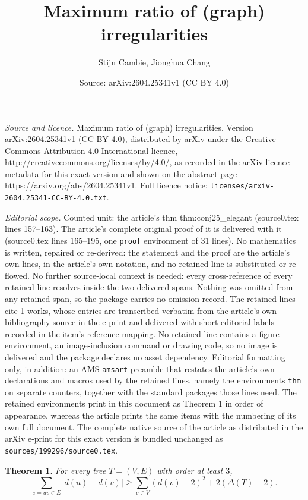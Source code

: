 \documentclass[10pt,a4paper]{amsart}
\title{Maximum ratio of (graph) irregularities}
\author{Stijn Cambie, Jionghua Chang}
\date{Source: arXiv:2604.25341v1 (CC BY 4.0)}
\newtheorem{thm}{Theorem}
\newcommand*{\abs}[1]{\lvert #1\rvert}
\begin{document}
\maketitle

\noindent\emph{Source and licence.} Maximum ratio of (graph) irregularities. Version arXiv:2604.25341v1 (CC BY 4.0), distributed by arXiv under the Creative Commons Attribution 4.0 International licence, http://creativecommons.org/licenses/by/4.0/, as recorded in the arXiv licence metadata for this exact version and shown on the abstract page https://arxiv.org/abs/2604.25341v1. Full licence notice: \texttt{licenses/arxiv-2604.25341-CC-BY-4.0.txt}.\par\smallskip

\noindent\textit{Editorial scope.} Counted unit: the article's thm thm:conj25\_elegant (source0.tex lines 157--163). The article's complete original proof of it is delivered with it (source0.tex lines 165--195, one \texttt{proof} environment of 31 lines). No mathematics is written, repaired or re-derived: the statement and the proof are the article's own lines, in the article's own notation, and no retained line is substituted or re-flowed.  No further source-local context is needed: every cross-reference of every retained line resolves inside the two delivered spans.  Nothing was omitted from any retained span, so the package carries no omission record.  The retained lines cite 1 works, whose entries are transcribed verbatim from the article's own bibliography source in the e-print and delivered with short editorial labels recorded in the item's reference mapping.  No retained line contains a figure environment, an image-inclusion command or drawing code, so no image is delivered and the package declares no asset dependency.  Editorial formatting only, in addition: an AMS \texttt{amsart} preamble that restates the article's own declarations and macros used by the retained lines, namely the environments \texttt{thm} on separate counters, together with the standard packages those lines need.  The retained environments print in this document as Theorem 1 in order of appearance, whereas the article prints the same items with the numbering of its own full document.  The complete native source of the article as distributed in the arXiv e-print for this exact version is bundled unchanged as \texttt{sources/199296/source0.tex}.
\begin{thm}\label{thm:conj25_elegant}
    For every tree $T=(V, E)$ with order at least $3$,
    $$\sum_{e=uv \in E} \abs{d(u)-d(v)} \ge \sum_{v \in V} ( d(v)-2)^2 +2(\Delta(T)-2)  .$$
\end{thm}
\end{document}
